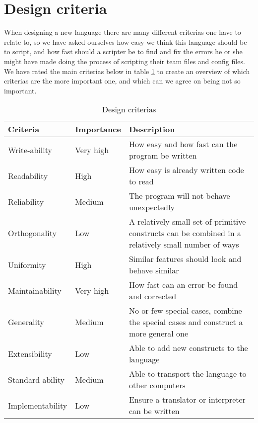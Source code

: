 
\section{Design criteria}

When designing a new language there are many different criterias one have to relate to, so we have asked ourselves how easy we think this language should be to script, and how fast should a scripter be to find and fix the errors he or she might have made doing the process of scripting their team files and config files. We have rated the main criterias below in table \ref{tab:criteria_tabular} to create an overview of which criterias are the more important one, and which can we agree on being not so important.  

%

\begin{table}[H]
	\begin{tabular}{| 	l	|	 l	| p{7cm}	|}
	\hline
	Criteria			&	Importance	&		Description	\\	
	\hline
	Write-ability 		& 	Very high	&		How easy and how fast can the program be written\\
	Readability			& 	High		&		How easy is already written code to read\\
	Reliability			& 	Medium		&		The program will not behave unexpectedly\\
	Orthogonality		& 	Low			&		A relatively small set of primitive constructs can be combined in a relatively small number of ways\\
	Uniformity			& 	High		&		Similar features should look and behave similar\\
	Maintainability		& 	Very high	&		How fast can an error be found and corrected\\
	Generality			& 	Medium		&		No or few special cases, combine the special cases and construct a more general one\\
	Extensibility		& 	Low			&		Able to add new constructs to the language\\
	Standard-ability		& 	Medium		&		Able to transport the language to other computers\\
	Implementability	& 	Low			&		Ensure a translator or interpreter can be written\\
	\hline
	\end{tabular}
	\caption{Design criterias \cite{criteria}}
	\label{tab:criteria_tabular}
\end{table}


